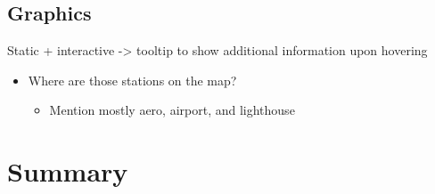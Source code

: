 \documentclass{article}
\begin{document}
\hypertarget{graphics}{%
\subsection{Graphics}\label{graphics}}

Static + interactive -\textgreater{} tooltip to show additional
information upon hovering

\begin{itemize}
\tightlist
\item
  Where are those stations on the map?

  \begin{itemize}
  \tightlist
  \item
    Mention mostly aero, airport, and lighthouse
  \end{itemize}
\end{itemize}

\hypertarget{summary}{%
\section{Summary}\label{summary}}



\end{document}
